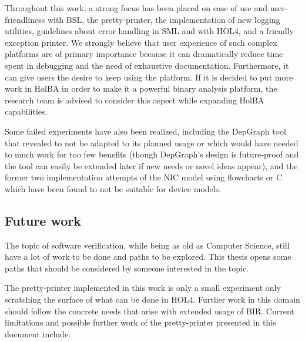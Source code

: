 \documentclass[10pt,a4paper]{article}
\begin{document}
\begin{multicols}{2}
Throughout this work, a strong focus has been placed on ease of use and user-friendliness with BSL, the pretty-printer, the implementation of new logging utilities, guidelines about error handling in SML and with HOL4, and a friendly exception printer. We strongly believe that user experience of such complex platforms are of primary importance because it can dramatically reduce time spent in debugging and the need of exhaustive documentation. Furthermore, it can give users the desire to keep using the platform. If it is decided to put more work in HolBA in order to make it a powerful binary analysis platform, the research team is advised to consider this aspect while expanding HolBA capabilities.

Some failed experiments have also been realized, including the DepGraph tool that revealed to not be adapted to its planned usage or which would have needed to much work for too few benefits (though DepGraph's design is future-proof and the tool can easily be extended later if new needs or novel ideas appear), and the former two implementation attempts of the NIC model using flowcharts or C which have been found to not be suitable for device models.

\subsection{Future work}

The topic of software verification, while being as old as Computer Science, still have a lot of work to be done and paths to be explored. This thesis opens some paths that should be considered by someone interested in the topic.

The pretty-printer implemented in this work is only a small experiment only scratching the surface of what can be done in HOL4. Further work in this domain should follow the concrete needs that arise with extended usage of BIR. Current limitations and possible further work of the pretty-printer presented in this document include:


\end{multicols}
\end{document}
